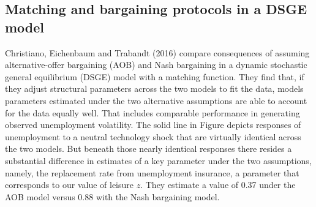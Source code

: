 \subsection{Matching and bargaining protocols in a  DSGE model}
Christiano, Eichenbaum and Trabandt (2016) compare consequences
of assuming
alternative-offer bargaining (AOB) and Nash bargaining
in a dynamic stochastic general equilibrium (DSGE)
model with a matching function. They find that,  if they adjust structural parameters across the two models  to  fit the  data,
 models parameters estimated under   the two alternative assumptions are  able to account for
the data equally well. That  includes comparable performance in   generating observed  unemployment volatility.
The solid line in Figure 
depicts responses of unemployment to a neutral technology
shock that are virtually identical across the two models.
But  beneath those nearly identical responses there resides  a substantial difference in estimates of a key parameter under
the two assumptions, namely,
the replacement rate from unemployment insurance, a parameter that
corresponds to our value of leisure $z$. They estimate a value of  0.37 under the AOB
model versus 0.88 with the Nash bargaining model.
%




